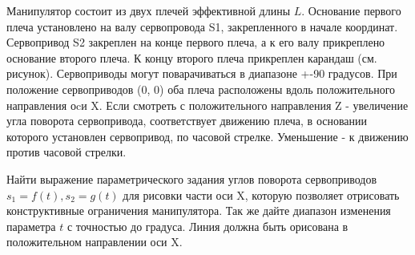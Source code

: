 
Манипулятор состоит из двух плечей эффективной длины $L$. Основание первого плеча установлено на валу сервопровода S1, закрепленного в начале координат. Сервопривод S2 закреплен на конце первого плеча, а к его валу прикреплено основание второго плеча. К концу второго плеча прикреплен карандаш (см. рисунок). Сервоприводы могут поварачиваться в диапазоне +-90 градусов. При положение сервоприводов (0\textdegree, 0\textdegree) оба плеча расположены вдоль положительного направления оcи X. Если смотреть с положительного направления Z - увеличение угла поворота сервопривода, соответствует движению плеча, в основании которого установлен сервопривод, по часовой стрелке. Уменьшение - к движению против часовой стрелки.


Найти выражение параметрического задания углов поворота сервоприводов $s_1 = f(t), s_2 = g(t)$ для рисовки части оси X, которую позволяет отрисовать конструктивные ограничения манипулятора. Так же дайте диапазон изменения параметра $t$ с точностью до градуса. Линия должна быть орисована в положительном направлении оси X.